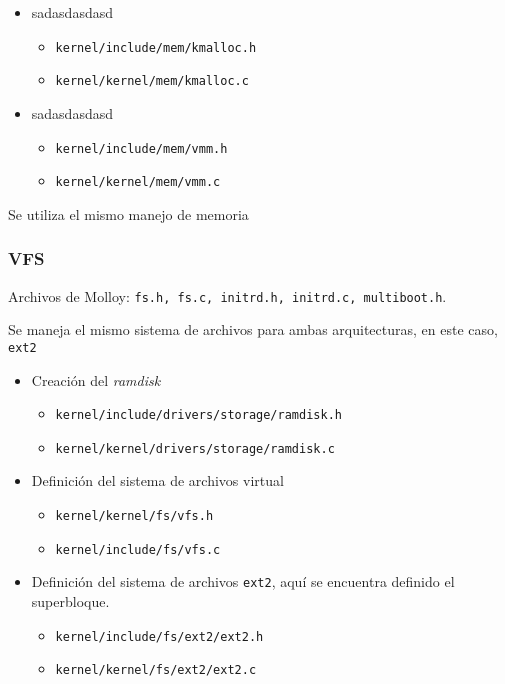 		\begin{itemize} \setlength\itemsep{0pt}
			\item sadasdasdasd
			\begin{itemize} \setlength\itemsep{0pt}
				\item \texttt{kernel/include/mem/kmalloc.h}
				\item \texttt{kernel/kernel/mem/kmalloc.c}
			\end{itemize}
			
			\item sadasdasdasd
			\begin{itemize} \setlength\itemsep{0pt}
				\item \texttt{kernel/include/mem/vmm.h}
				\item \texttt{kernel/kernel/mem/vmm.c}
			\end{itemize}
			
		\end{itemize}
	
		Se utiliza el mismo manejo de memoria 
		
	
	
	
	\subsubsection{VFS}
		Archivos de Molloy: \texttt{fs.h, fs.c, initrd.h, initrd.c, multiboot.h}.
		
		Se maneja el mismo sistema de archivos para ambas arquitecturas, en este caso, \texttt{ext2}
		\begin{itemize} \setlength\itemsep{0pt}
			\item Creación del \textit{ramdisk}
			\begin{itemize} \setlength\itemsep{0pt}
				\item \texttt{kernel/include/drivers/storage/ramdisk.h}
				\item \texttt{kernel/kernel/drivers/storage/ramdisk.c}
			\end{itemize}
		
			\item Definición del sistema de archivos virtual
			\begin{itemize} \setlength\itemsep{0pt}
				\item \texttt{kernel/kernel/fs/vfs.h}
				\item \texttt{kernel/include/fs/vfs.c}
			\end{itemize}
		
			\item Definición del sistema de archivos \texttt{ext2}, aquí se encuentra definido el superbloque.
			\begin{itemize} \setlength\itemsep{0pt}
				\item \texttt{kernel/include/fs/ext2/ext2.h}
				\item \texttt{kernel/kernel/fs/ext2/ext2.c}
			\end{itemize}
		\end{itemize}
		
